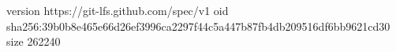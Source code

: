 version https://git-lfs.github.com/spec/v1
oid sha256:39b0b8e465e66d26ef3996ca2297f44c5a447b87fb4db209516df6bb9621cd30
size 262240
